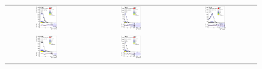 \begin{figure}[tp]
  \centering
  \begin{tabular}{ccc}
  \includegraphics[width=0.27\textwidth]{Analysis/Figures_ttH/tesis_vars/prefit/lep_pt_4jetex3btagex.eps} &
  \includegraphics[width=0.27\textwidth]{Analysis/Figures_ttH/tesis_vars/prefit/met_4jetex3btagex.eps} &
  \includegraphics[width=0.27\textwidth]{Analysis/Figures_ttH/tesis_vars/prefit/WlepMT_4jetex3btagex.eps} \\
  \includegraphics[width=0.27\textwidth]{Analysis/Figures_ttH/tesis_vars/postfit/lep_pt_4jetex3btagex.eps} &
  \includegraphics[width=0.27\textwidth]{Analysis/Figures_ttH/tesis_vars/postfit/met_4jetex3btagex.eps} &

\end{tabular}
\end{figure}
